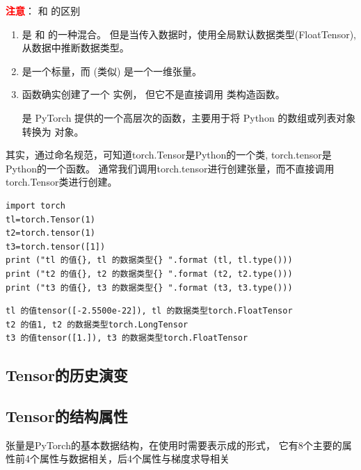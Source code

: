 \textcolor{red}{\textbf{注意}}： 和  的区别
\begin{enumerate}[label=\arabic*)]
    \item {} 是  和  的一种混合。
    但是当传入数据时，使用全局默认数据类型(FloatTensor), 
    从数据中推断数据类型。

    \item {} 是一个标量，而 (类似) 是一个一维张量。

    \item {} 函数确实创建了一个  实例，
    但它不是直接调用  类构造函数。
    
     是 PyTorch 提供的一个高层次的函数，主要用于将 Python 的数组或列表对象转换为  对象。
\end{enumerate}

其实，通过命名规范，可知道torch.Tensor是Python的一个类, torch.tensor是Python的一个函数。
通常我们调用torch.tensor进行创建张量，而不直接调用torch.Tensor类进行创建。

\begin{lstlisting}[style=pythonstyle]
import torch
tl=torch.Tensor(1)
t2=torch.tensor(1)
t3=torch.tensor([1])
print ("tl 的值{}, tl 的数据类型{} ".format (tl, tl.type()))
print ("t2 的值{}, t2 的数据类型{} ".format (t2, t2.type()))
print ("t3 的值{}, t3 的数据类型{} ".format (t3, t3.type()))
\end{lstlisting}
\begin{lstlisting}[style=demostyle,numbers=none]
tl 的值tensor([-2.5500e-22]), tl 的数据类型torch.FloatTensor 
t2 的值1, t2 的数据类型torch.LongTensor 
t3 的值tensor([1.]), t3 的数据类型torch.FloatTensor 
\end{lstlisting}

\subsection{Tensor的历史演变}
\subsection{Tensor的结构属性}
张量是PyTorch的基本数据结构，在使用时需要表示成的形式，
它有8个主要的属性前4个属性与数据相关，后4个属性与梯度求导相关

